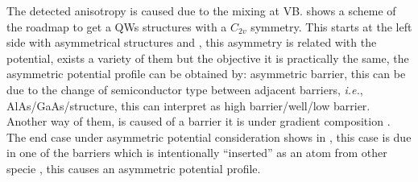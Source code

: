 The detected  anisotropy is caused due to the mixing at \gls{VB}.  shows a scheme of the roadmap to get a \gls{QW}s structures with a $C_{2v}$ symmetry. This starts at the left side with asymmetrical structures  and , this asymmetry is related with the potential, exists a variety of them but the objective it is practically the same, the asymmetric potential profile  can be obtained by: asymmetric barrier, this can be due to the change of semiconductor type between adjacent barriers, \textit{i.e.}, AlAs/GaAs/\algaas structure, this can interpret as
high barrier/well/low barrier\cite{koopmans1998microscopic}. Another way of them, is caused of a barrier it is under
gradient composition \cite{english2013effect,eldridge2011spinorbit}. The end case under asymmetric potential consideration shows in , this case is due in one of the barriers which is intentionally ``inserted'' as an atom from other specie \cite{yu2015tuning}, this causes an asymmetric potential profile.
